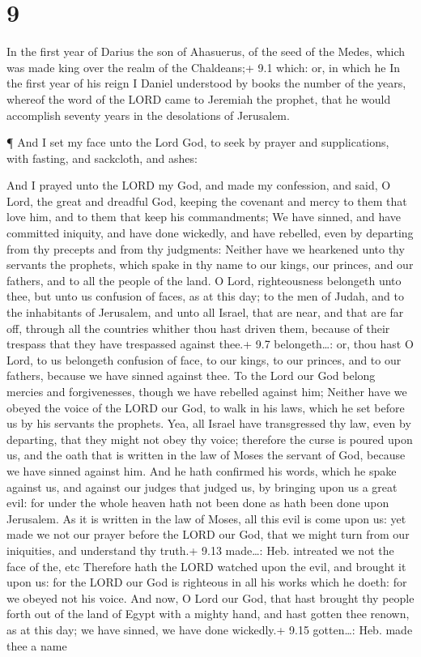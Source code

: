 \hypertarget{section-8}{%
\section{9}\label{section-8}}

 In the first year of Darius the son of Ahasuerus, of the
seed of the Medes, which was made king over the realm of the Chaldeans;+
9.1 which: or, in which he  In the first year of his reign I
Daniel understood by books the number of the years, whereof the word of
the LORD came to Jeremiah the prophet, that he would accomplish seventy
years in the desolations of Jerusalem.

 ¶ And I set my face unto the Lord God, to seek by prayer
and supplications, with fasting, and sackcloth, and ashes:

 And I prayed unto the LORD my God, and made my confession,
and said, O Lord, the great and dreadful God, keeping the covenant and
mercy to them that love him, and to them that keep his commandments;
 We have sinned, and have committed iniquity, and have done
wickedly, and have rebelled, even by departing from thy precepts and
from thy judgments:  Neither have we hearkened unto thy
servants the prophets, which spake in thy name to our kings, our
princes, and our fathers, and to all the people of the land.
 O Lord, righteousness belongeth unto thee, but unto us
confusion of faces, as at this day; to the men of Judah, and to the
inhabitants of Jerusalem, and unto all Israel, that are near, and that
are far off, through all the countries whither thou hast driven them,
because of their trespass that they have trespassed against thee.+ 9.7
belongeth\ldots: or, thou hast  O Lord, to us belongeth
confusion of face, to our kings, to our princes, and to our fathers,
because we have sinned against thee.  To the Lord our God
belong mercies and forgivenesses, though we have rebelled against him;
 Neither have we obeyed the voice of the LORD our God, to
walk in his laws, which he set before us by his servants the prophets.
 Yea, all Israel have transgressed thy law, even by
departing, that they might not obey thy voice; therefore the curse is
poured upon us, and the oath that is written in the law of Moses the
servant of God, because we have sinned against him.  And he
hath confirmed his words, which he spake against us, and against our
judges that judged us, by bringing upon us a great evil: for under the
whole heaven hath not been done as hath been done upon Jerusalem.
 As it is written in the law of Moses, all this evil is
come upon us: yet made we not our prayer before the LORD our God, that
we might turn from our iniquities, and understand thy truth.+ 9.13
made\ldots: Heb. intreated we not the face of the, etc 
Therefore hath the LORD watched upon the evil, and brought it upon us:
for the LORD our God is righteous in all his works which he doeth: for
we obeyed not his voice.  And now, O Lord our God, that
hast brought thy people forth out of the land of Egypt with a mighty
hand, and hast gotten thee renown, as at this day; we have sinned, we
have done wickedly.+ 9.15 gotten\ldots: Heb. made thee a name

